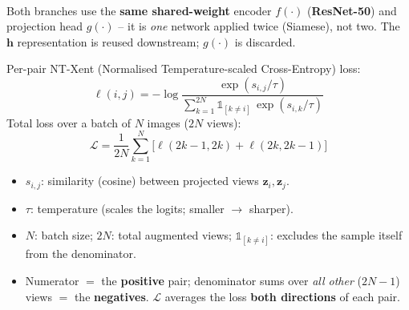 \documentclass[10pt,a4paper]{article}
\begin{document}
	\begin{center}
	\\[2pt]
	{\footnotesize Both branches use the \textbf{same shared-weight} encoder $f(\cdot)$ (\textbf{ResNet-50}) and projection head $g(\cdot)$ -- it is \emph{one} network applied twice (Siamese), not two. The $\mathbf{h}$ representation is reused downstream; $g(\cdot)$ is discarded.}
	\end{center}

	\begin{formulabox}
		Per-pair NT-Xent (Normalised Temperature-scaled Cross-Entropy) loss:
		\[ \ell(i,j) = -\log \frac{\exp(s_{i,j}/\tau)}{\sum_{k=1}^{2N} \mathbb{1}_{[k\neq i]}\,\exp(s_{i,k}/\tau)} \]
		Total loss over a batch of $N$ images ($2N$ views):
		\[ \mathcal{L} = \frac{1}{2N}\sum_{k=1}^{N}\big[\ell(2k-1,2k)+\ell(2k,2k-1)\big] \]
	\end{formulabox}

	\begin{itemize}[leftmargin=*]
		\item $s_{i,j}$: similarity (cosine) between projected views $\mathbf{z}_i,\mathbf{z}_j$.
		\item $\tau$: temperature (scales the logits; smaller $\to$ sharper).
		\item $N$: batch size; $2N$: total augmented views; $\mathbb{1}_{[k\neq i]}$: excludes the sample itself from the denominator.
		\item Numerator $=$ the \textbf{positive} pair; denominator sums over \emph{all other} ($2N-1$) views $=$ the \textbf{negatives}. $\mathcal{L}$ averages the loss \textbf{both directions} of each pair.
	\end{itemize}
\end{document}
